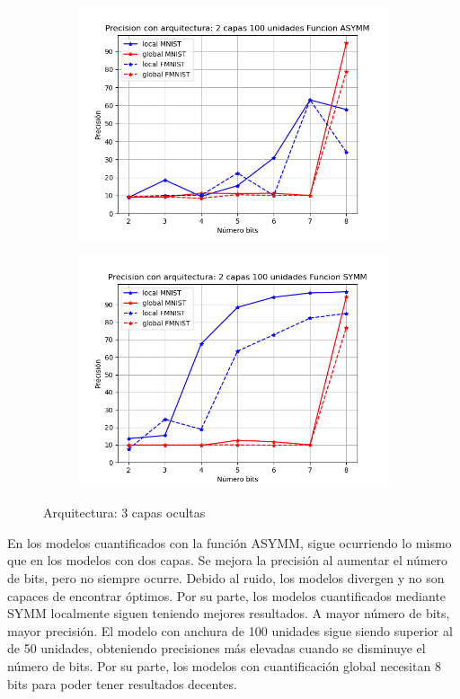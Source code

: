 \begin{figure}[H]
\begin{subfigure}[H]{0.475\textwidth}
    \includegraphics[width=\textwidth]{imagenes/backprop/Precision con arquitectura: 2 capas 100 unidades Funcion ASYMM.png}
    \end{subfigure}
    \begin{subfigure}[H]{0.475\textwidth}
    \includegraphics[width=\textwidth]{imagenes/backprop/Precision con arquitectura: 2 capas 100 unidades Funcion SYMM.png}
    \end{subfigure}
    \caption{Arquitectura: 3 capas ocultas}
\end{figure}

En los modelos cuantificados con la función ASYMM, sigue ocurriendo lo mismo que en los modelos con dos capas. Se mejora la precisión al aumentar el número de bits, pero no siempre ocurre. Debido al ruido, los modelos divergen y no son capaces de encontrar óptimos. Por su parte, los modelos cuantificados mediante SYMM localmente siguen teniendo mejores resultados. A mayor número de bits, mayor precisión. El modelo con anchura de 100 unidades sigue siendo superior al de 50 unidades, obteniendo precisiones más elevadas cuando se disminuye el número de bits. Por su parte, los modelos con cuantificación global necesitan 8 bits para poder tener resultados decentes.

